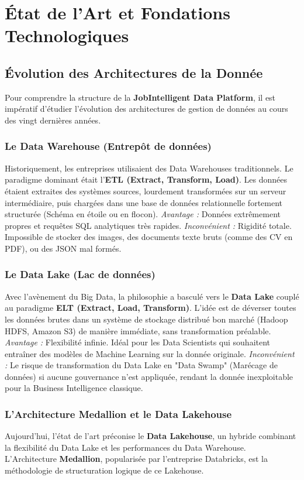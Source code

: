 \documentclass[12pt,a4paper,twoside]{report}
\begin{document}
\chapter{État de l'Art et Fondations Technologiques}

\section{Évolution des Architectures de la Donnée}

Pour comprendre la structure de la \textbf{JobIntelligent Data Platform}, il est impératif d'étudier l'évolution des architectures de gestion de données au cours des vingt dernières années.

\subsection{Le Data Warehouse (Entrepôt de données)}
Historiquement, les entreprises utilisaient des Data Warehouses traditionnels. Le paradigme dominant était l'\textbf{ETL (Extract, Transform, Load)}. Les données étaient extraites des systèmes sources, lourdement transformées sur un serveur intermédiaire, puis chargées dans une base de données relationnelle fortement structurée (Schéma en étoile ou en flocon). 
\textit{Avantage :} Données extrêmement propres et requêtes SQL analytiques très rapides.
\textit{Inconvénient :} Rigidité totale. Impossible de stocker des images, des documents texte bruts (comme des CV en PDF), ou des JSON mal formés.

\subsection{Le Data Lake (Lac de données)}
Avec l'avènement du Big Data, la philosophie a basculé vers le \textbf{Data Lake} couplé au paradigme \textbf{ELT (Extract, Load, Transform)}. L'idée est de déverser toutes les données brutes dans un système de stockage distribué bon marché (Hadoop HDFS, Amazon S3) de manière immédiate, sans transformation préalable.
\textit{Avantage :} Flexibilité infinie. Idéal pour les Data Scientists qui souhaitent entraîner des modèles de Machine Learning sur la donnée originale.
\textit{Inconvénient :} Le risque de transformation du Data Lake en "Data Swamp" (Marécage de données) si aucune gouvernance n'est appliquée, rendant la donnée inexploitable pour la Business Intelligence classique.

\subsection{L'Architecture Medallion et le Data Lakehouse}
Aujourd'hui, l'état de l'art préconise le \textbf{Data Lakehouse}, un hybride combinant la flexibilité du Data Lake et les performances du Data Warehouse. L'Architecture \textbf{Medallion}, popularisée par l'entreprise Databricks, est la méthodologie de structuration logique de ce Lakehouse.
\end{document}
